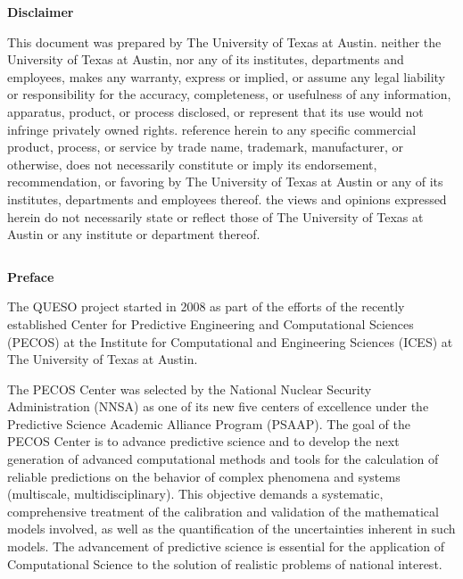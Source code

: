 \clearpage
$~$\\

\clearpage
\centerline{\Large\bf Disclaimer }
$~$\\
    This document was prepared
    by The University of Texas at Austin.
    neither the University of Texas
    at Austin, nor any of its institutes, departments and employees, makes any warranty, express or implied,
    or assume any legal liability or responsibility for the accuracy, completeness, or
    usefulness of any information, apparatus, product, or process disclosed, or represent
    that its use would not infringe privately owned rights. reference herein to any specific
    commercial product, process, or service by trade name, trademark, manufacturer, or otherwise,
    does not necessarily constitute or imply its endorsement, recommendation, or favoring by
    The University of Texas at Austin or any of its institutes, departments and employees thereof.
    the views and opinions expressed herein do not necessarily state or reflect
    those of The University of Texas at Austin or any institute or department
    thereof.

\clearpage
$~$\\

\clearpage
{\markboth{}{}
}
\tableofcontents


\clearpage
\thispagestyle{empty}
\centerline{\Large\bf Preface}
$~$\\
The QUESO project started in 2008 as part
of the efforts of the recently established Center for Predictive Engineering and Computational Sciences (PECOS)
at the Institute for Computational and Engineering Sciences (ICES) at The University of Texas at Austin.

The PECOS Center was selected by the National Nuclear Security Administration (NNSA) as one of its new five centers of excellence
under the Predictive Science Academic Alliance Program (PSAAP).
The goal of the PECOS Center is
to advance predictive science and to develop the next generation of advanced computational methods and tools
for the calculation of reliable predictions on the behavior of complex phenomena and systems (multiscale, multidisciplinary).
This objective demands a systematic, comprehensive treatment of the calibration and validation of the mathematical models involved,
as well as the quantification of the uncertainties inherent in such models.
The advancement of predictive science is essential for the application of Computational Science to the solution of realistic problems of national interest.

